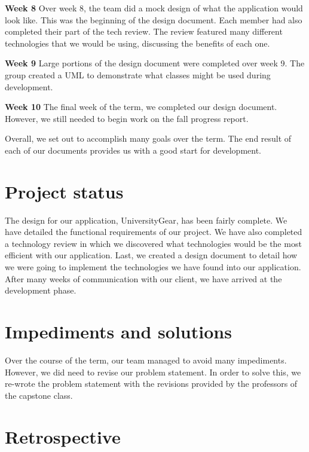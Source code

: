\documentclass[journal,compsoc, 10pt, draftclsnofoot, onecolumn]{IEEEtran}
\begin{document}
\textbf{Week 8}\newline
Over week 8, the team did a mock design of what the application would look like. 
This was the beginning of the design document. Each member had also completed 
their part of the tech review. The review featured many different technologies that 
we would be using, discussing the benefits of each one. \newline

\textbf{Week 9}\newline
Large portions of the design document were completed over week 9. The group 
created a UML to demonstrate what classes might be used during development. 
\newline

\textbf{Week 10}\newline
The final week of the term, we completed our design document. However, we still 
needed to begin work on the fall progress report. \newline

Overall, we set out to accomplish many goals over the term. The end result of 
each of our documents provides us with a good start for development. 

\section{Project status}
The design for our application, UniversityGear, has been fairly complete. We 
have detailed the functional requirements of our project. We have also completed 
a technology review in which we discovered what technologies would be the most 
efficient with our application. Last, we created a design document to detail how 
we were going to implement the technologies we have found into our application.
After many weeks of communication with our client, we have arrived at the 
development phase.

\section{Impediments and solutions}
Over the course of the term, our team managed to avoid many impediments. However, 
we did need to revise our problem statement. In order to solve this, we re-wrote the 
problem statement with the revisions provided by the professors of the capstone 
class. 

\section{Retrospective}
\end{document}
